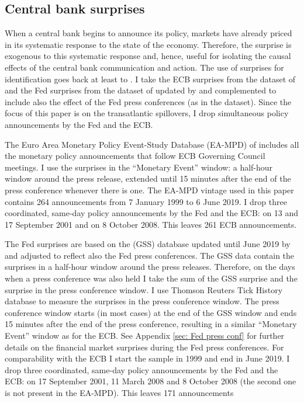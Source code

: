 \documentclass[a4paper,12pt]{article}
\begin{document}
\subsection{Central bank surprises}

When a central bank begins to announce its policy, markets have already priced in its systematic response
to the state of the economy. 
Therefore, the surprise is exogenous to this systematic response and, hence, useful for isolating the causal effects of the central bank communication and action.
The use of surprises for identification goes back at least to \cite{Kuttner_2001}. I
take the ECB surprises from the dataset of \cite{Altavilla_etal_2019}
and the Fed surprises from the dataset of \cite{Gurkaynak_Sack_Swanson_2005a} updated by \cite{Gurkaynak_Karasoy_Lee_2021} and
complemented to include also the effect of the Fed press conferences (as in the \citealt{Altavilla_etal_2019} dataset).
Since the focus of this paper is on the transatlantic spillovers, I drop simultaneous policy announcements
by the Fed and the ECB.

The Euro Area Monetary Policy Event-Study Database (EA-MPD) of \cite{Altavilla_etal_2019}
includes all the monetary policy announcements that follow ECB Governing Council meetings.
I use the surprises in the ``Monetary Event'' window: a half-hour window around the press release, extended until 15 minutes after the end of the press conference whenever there is one.
The EA-MPD vintage used in this paper contains 264 announcements from 7 January 1999 to 6 June 2019. I drop three coordinated, same-day policy announcements by the Fed and the ECB: on 13 and 17 September 2001 and on 8 October 2008. This leaves 261 ECB announcements.

The Fed surprises are based on the \cite{Gurkaynak_Sack_Swanson_2005a} (GSS) database
updated until June 2019 by \cite{Gurkaynak_Karasoy_Lee_2021}
and adjusted to reflect also the Fed press conferences.
The GSS data contain the surprises in a half-hour window around the press releases.
Therefore, on the days when a press conference was also held I take the sum of the GSS surprise and the surprise in the press conference window.
I use Thomson Reuters Tick History database to measure
the surprises in the press conference window. 
The press conference window starts (in most cases) at the end of the GSS window and 
ends 15 minutes after the end of the press conference,
resulting in a similar ``Monetary Event'' window as for the ECB.
See Appendix \ref{sec: Fed press conf} for further details on the financial market surprises during the Fed press conferences.
For comparability with the ECB I start the sample in 1999 and end in June 2019. I drop three coordinated, same-day policy announcements by the Fed and the ECB: on 17 September 2001, 11 March 2008 and 8 October 2008 (the second one is not present in the EA-MPD). This leaves 171 announcements
\end{document}
